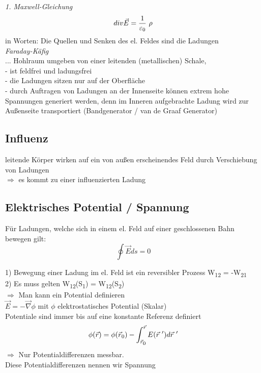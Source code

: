 \documentclass[a4paper,12pt]{report}
\begin{document}
\emph{1. Maxwell-Gleichung}\\
\begin{equation}
div \vec{E} = \frac{1}{\varepsilon\textsubscript{0}}\ \rho
\end{equation}
in Worten: Die Quellen und Senken des el. Feldes sind die Ladungen\\

\emph{Faraday-Käfig}\\
... Hohlraum umgeben von einer leitenden (metallischen) Schale, \\
- ist feldfrei und ladungsfrei\\
- die Ladungen sitzen nur auf der Oberfläche\\
- durch Auftragen von Ladungen an der Innenseite können extrem hohe Spannungen generiert werden, denn im Inneren aufgebrachte Ladung wird zur Außenseite transportiert (Bandgenerator / van de Graaf Generator)\\

\subsection{Influenz}
leitende Körper wirken auf ein von außen erscheinendes Feld durch Verschiebung von Ladungen\\
$ \Rightarrow $ es kommt zu einer influenzierten Ladung\\

\subsection{Elektrisches Potential / Spannung}
Für Ladungen, welche sich in einem el. Feld auf einer geschlossenen Bahn bewegen gilt: 
\begin{equation}
\oint \vec{E} ds = 0
\end{equation}


1) Bewegung einer Ladung im el. Feld ist ein reversibler Prozess W\textsubscript{12} = -W\textsubscript{21}\\
2) Es muss gelten W\textsubscript{12}(S\textsubscript{1}) = W\textsubscript{12}(S\textsubscript{2})\\

$ \Rightarrow $ Man kann ein Potential definieren\\


$ \vec{E} = - \vec{\nabla} \phi $ mit $ \phi $ elektrostatisches Potential (Skalar)\\

Potentiale sind immer bis auf eine konstante Referenz definiert\\
\begin{equation}
\phi (\vec{r}) = \phi(\vec{r} \textsubscript{0}) - \int_{\vec{r}\textsubscript{0}}^{\vec{r}} E(\vec{r} \ \sp{\prime}) d\vec{r}\ \sp{\prime}\\
\end{equation}
$ \Rightarrow $ Nur Potentialdifferenzen messbar.\\
Diese Potentialdifferenzen nennen wir Spannung 
\end{document}
